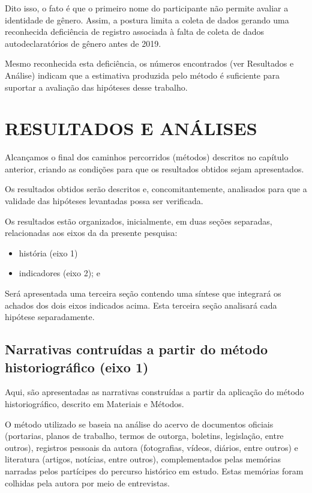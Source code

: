 Dito isso, o fato é que o primeiro nome do participante não permite avaliar a identidade de gênero. Assim, a postura limita a coleta de dados gerando uma reconhecida deficiência de registro associada à falta de coleta de dados autodeclaratórios de gênero antes de 2019.

Mesmo reconhecida esta deficiência, os números encontrados (ver Resultados e Análise) indicam que a estimativa produzida pelo método é suficiente para suportar a avaliação das hipóteses desse trabalho.

\chapter[RESULTADOS E ANÁLISES]{RESULTADOS E ANÁLISES}\label{RESULTADOS E ANÁLISES}
Alcançamos o final dos caminhos percorridos (métodos) descritos no capítulo anterior, criando as condições para que os resultados obtidos sejam apresentados.

Os resultados obtidos serão descritos e, concomitantemente, analisados para que a validade das hipóteses levantadas possa ser verificada.

Os resultados estão organizados, inicialmente, em duas seções separadas, relacionadas aos eixos da da presente pesquisa:


\begin{itemize}
\item história (eixo 1)
\item indicadores (eixo 2); e
\end{itemize}

Será apresentada uma terceira seção contendo uma síntese que integrará os achados dos dois eixos indicados acima. Esta terceira seção analisará cada hipótese separadamente.

\section[Narrativas contruídas a partir do método historiográfico (eixo 1)]{Narrativas contruídas a partir do método historiográfico (eixo 1)}\label{Narrativas contruídas a partir do método historiográfico (eixo 1)}
Aqui, são apresentadas as narrativas construídas a partir da aplicação do método historiográfico, descrito em Materiais e Métodos.

O método utilizado se baseia na análise do acervo de documentos oficiais (portarias, planos de trabalho, termos de outorga, boletins, legislação, entre outros), registros pessoais da autora (fotografias, vídeos, diários, entre outros) e literatura (artigos, notícias, entre outros), complementados pelas memórias narradas pelos partícipes do percurso histórico em estudo. Estas memórias foram colhidas pela autora por meio de entrevistas.


